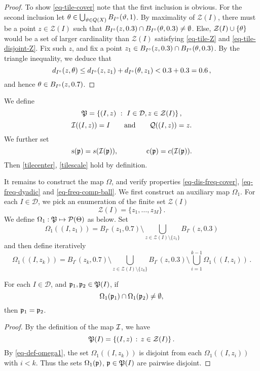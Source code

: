 {\begin{proof}
    To show \eqref{eq-tile-cover} note that the first inclusion is obvious. For the second inclusion let $\mfb \in  \bigcup_{\mfa \in \tQ(X)} B_{I^\circ}(\mfa, 1)$. By maximality of $\mathcal{Z}(I)$, there must be a point $z \in \mathcal{Z}(I)$ such that $B_{I^\circ}(z, 0.3) \cap B_{I^\circ}(\mfb, 0.3) \ne \emptyset$. Else, $\mathcal{Z}(I) \cup \{\mfb\}$ would be a set of larger cardinality than $\mathcal{Z}(I)$ satisfying \eqref{eq-tile-Z} and \eqref{eq-tile-disjoint-Z}. Fix such $z$, and fix a point $z_1 \in B_{I^\circ}(z, 0.3) \cap B_{I^\circ}(\mfb, 0.3)$. By the triangle inequality, we deduce that
    $$
        d_{I^\circ}(z,\mfb) \le d_{I^\circ}(z,z_1) + d_{I^\circ}(\mfb, z_1) < 0.3 + 0.3 = 0.6\,,
    $$
    and hence $\mfb \in B_{I^\circ}(z, 0.7)$.
\end{proof}

We define
$$
    \fP = \{(I, z) \ : \ I \in \mathcal{D}, z \in \mathcal{Z}(I)\}\,,
$$
$$\sc((I, z)) = I\qquad \text{and} \qquad \fcc((I, z)) = z.$$ We further set $$\ps(\fp) = s(\sc(\fp)),\qquad \qquad \pc(\fp) = c(\sc(\fp)).$$ Then \eqref{tilecenter}, \eqref{tilescale} hold by definition.

It remains to construct the map $\Omega$, and verify properties \eqref{eq-dis-freq-cover}, \eqref{eq-freq-dyadic} and
\eqref{eq-freq-comp-ball}. We first construct an auxiliary map $\Omega_1$. For each $I \in \mathcal{D}$, we pick an enumeration of the finite set $\mathcal{Z}(I)$
$$
    \mathcal{Z}(I) = \{z_1, \dotsc, z_M\}\,.
$$
We define {$\Omega_1:\fP \mapsto \mathcal{P}(\Mf) $ as below}. Set
$$
    \Omega_1((I, z_1)) = B_{I^\circ}(z_1, 0.7) \setminus \bigcup_{z \in \mathcal{Z}(I)\setminus \{z_1\}} B_{I^\circ}(z, 0.3)
$$
and then define iteratively
\begin{equation}
    \label{eq-def-omega1}
    \Omega_1((I, z_k)) = B_{I^\circ}(z_k, 0.7) \setminus \bigcup_{z \in \mathcal{Z}(I) \setminus \{z_k\}} B_{I^\circ}(z, 0.3) \setminus \bigcup_{i=1}^{k-1} \Omega_1((I, z_i))\,.
\end{equation}
\begin{lemma}
    \label{disjoint-frequency-cubes}

    For each $I \in \mathcal{D}$, and $\fp_1, \fp_2\in \fP(I)$, if $$\Omega_1(\fp_1)\cap \Omega_1(\fp_2)\neq \emptyset,$$ then $\fp_1=\fp_2$.
\end{lemma}

\begin{proof}
    By the definition of the map $\sc$, we have
    $$
        \fP(I) = \{(I, z) \, : \, z \in \mathcal{Z}(I)\}\,.
    $$
    By \eqref{eq-def-omega1}, the set $\Omega_1((I, z_k))$ is disjoint from each $\Omega_1((I, z_i))$ with $i < k$. Thus the sets $\Omega_1(\fp)$, $\fp \in \fP(I)$ are pairwise disjoint.
\end{proof}

}
